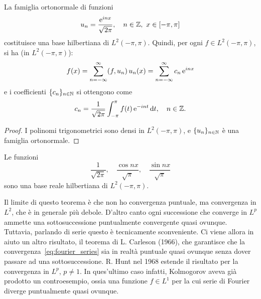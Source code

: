 \begin{theorem}
\label{th:hilb_thirteen}
	La famiglia ortonormale di funzioni
	\begin{equation*}
		u_n = \frac{\mathrm{e}^{inx}}{\sqrt{2\pi}}, \quad n \in \mathbb{Z},\ x \in [-\pi,\pi]
	\end{equation*}
	costituisce una base hilbertiana di $L^2(-\pi, \pi)$. Quindi, per ogni $f \in L^2(-\pi,\pi)$, si ha (in $L^2(-\pi,\pi)$):
	\begin{equation}
	\label{eq:fourier_series}
		f(x) = \sum_{n=-\infty}^\infty (f,u_n)\,u_n(x) = \sum_{n=-\infty}^\infty c_n\,\mathrm{e}^{inx}
	\end{equation}
	e i coefficienti $\{c_n\}_{n \in \mathbb{N}}$ si ottengono come
	\begin{equation*}
		c_n = \frac1{\sqrt{2\pi}} \int_{-\pi}^\pi f(t) \,\mathrm{e}^{-int}\,\mathrm{d} t, \quad n \in \mathbb{Z}.
	\end{equation*}
\end{theorem}
\begin{proof}
	I polinomi trigonometrici sono densi in $L^2(-\pi,\pi)$, e $\{u_n\}_{n \in \mathbb{N}}$ è una famiglia ortonormale.
\end{proof}

\begin{remark}
	Le funzioni
	\begin{equation*}
		\frac1{\sqrt{2\pi}}, \quad \frac{\cos nx}{\sqrt{\pi}}, \quad \frac{\sin nx}{\sqrt{\pi}}
	\end{equation*}
	sono una base reale hilbertiana di $L^2(-\pi,\pi)$.
\end{remark}

Il limite di questo teorema è che non ho convergenza puntuale, ma convergenza in $L^2$, che è in generale più debole.
D'altro canto ogni successione che converge in $L^p$ ammette una sottosuccessione puntualmente convergente quasi ovunque.
Tuttavia, parlando di serie questo è tecnicamente sconveniente. Ci viene allora in aiuto un altro risultato, il teorema di L. Carleson (1966), che garantisce che la convergenza~\eqref{eq:fourier_series} sia in realtà puntuale quasi ovunque senza dover passare ad una sottosuccessione.
R. Hunt nel 1968 estende il risultato per la convergenza in $L^p$, $p \neq 1$. In ques'ultimo caso infatti, Kolmogorov aveva già prodotto un controesempio, ossia una funzione $f \in L^1$ per la cui serie di Fourier diverge puntualmente quasi ovunque.
